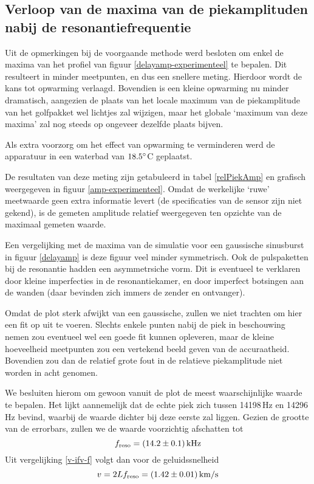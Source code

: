 \subsection{Verloop van de maxima van de piekamplituden nabij de 
resonantiefrequentie}
Uit de opmerkingen bij de voorgaande methode werd besloten om enkel de 
maxima van het profiel van figuur \ref{delayamp-experimenteel} te bepalen.  
Dit resulteert in minder meetpunten, en dus een snellere meting. Hierdoor 
wordt de kans tot opwarming verlaagd. Bovendien is een kleine opwarming nu 
minder dramatisch, aangezien de plaats van het locale maximum van de 
piekamplitude van het golfpakket wel lichtjes zal wijzigen, maar het 
globale `maximum van deze maxima' zal nog steeds op ongeveer dezelfde 
plaats bijven.

Als extra voorzorg om het effect van opwarming te verminderen werd de 
apparatuur in een waterbad van $18.5^\circ$C geplaatst.

De resultaten van deze meting zijn getabuleerd in tabel \ref{relPiekAmp} en 
grafisch weergegeven in figuur \ref{amp-experimenteel}. Omdat de werkelijke 
`ruwe' meetwaarde geen extra informatie levert (de specificaties van de 
sensor zijn niet gekend), is de gemeten amplitude relatief weergegeven ten 
opzichte van de maximaal gemeten waarde.

\relPiekAmp
{}

Een vergelijking met de maxima van de simulatie voor een gaussische 
sinusburst in figuur \ref{delayamp} is deze figuur veel minder symmetrisch.  
Ook de pulspaketten bij de resonantie hadden een asymmetrsiche vorm. Dit is 
eventueel te verklaren door kleine imperfecties in de resonantiekamer, en 
door imperfect botsingen aan de wanden (daar bevinden zich immers de zender 
en ontvanger).

Omdat de plot sterk afwijkt van een gaussische, zullen we niet trachten om 
hier een fit op uit te voeren. Slechts enkele punten nabij de piek in 
beschouwing nemen zou eventueel wel een goede fit kunnen opleveren, maar de 
kleine hoeveelheid meetpunten zou een vertekend beeld geven van de 
accuraatheid. Bovendien zou dan de relatief grote fout in de relatieve 
piekamplitude niet worden in acht genomen.

We besluiten hierom om gewoon vanuit de plot de meest waarschijnlijke 
waarde te bepalen. Het lijkt aannemelijk dat de echte piek zich tussen
14198\,Hz en 14296\,Hz bevind, waarbij de waarde dichter bij deze eerste 
zal liggen. Gezien de grootte van de errorbars, zullen we de waarde 
voorzichtig afschatten tot
$$
f_\mathrm{reso} = (14.2 \pm 0.1)\,\rm kHz
$$
Uit vergelijking \ref{v-ifv-f} volgt dan voor de geluidssnelheid
$$
v = 2Lf_\mathrm{reso}
= (1.42 \pm 0.01)\,\rm km/s
$$

